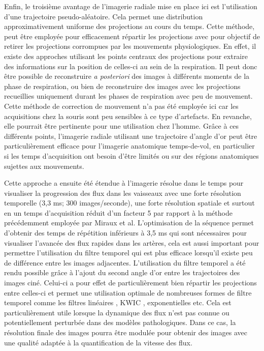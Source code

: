 Enfin, le troisième avantage de l’imagerie radiale mise en place ici est l’utilisation d’une trajectoire pseudo-aléatoire. Cela permet une distribution approximativement uniforme des projections au cours du temps. Cette méthode, peut être employée pour efficacement répartir les projections avec pour objectif de retirer les projections corrompues par les mouvements physiologiques. En effet, il existe des approches utilisant les points centraux des projections pour extraire des informations sur la position de celles-ci au sein de la respiration. Il peut donc être possible de reconstruire \textit{a posteriori} des images à différents moments de la phase de respiration, ou bien de reconstruire des images avec les projections recueillies uniquement durant les phases de respiration avec peu de mouvement. Cette méthode de correction de mouvement n’a pas été employée ici car les acquisitions chez la souris sont peu sensibles à ce type d’artefacts. En revanche, elle pourrait être pertinente pour une utilisation chez l’homme. Grâce à ces différents points, l’imagerie radiale utilisant une trajectoire d’angle d’or peut être particulièrement efficace pour l’imagerie anatomique temps-de-vol, en particulier si les temps d’acquisition ont besoin d’être limités ou sur des régions anatomiques sujettes aux mouvements.
 

Cette approche a ensuite été étendue à l'imagerie résolue dans le temps pour visualiser la progression des flux dans les vaisseaux avec une forte résolution temporelle (3,3 ms; 300 images/seconde), une forte résolution spatiale et surtout en un temps d'acquisition réduit d'un facteur 5 par rapport à la méthode précédemment employée par Miraux et al.
L'optimisation de la séquence permet d'obtenir des temps de répétition inférieurs à 3,5 ms qui sont nécessaires pour visualiser l'avancée des flux rapides dans les artères, cela est aussi important pour permettre l'utilisation du filtre temporel qui est plus efficace lorsqu'il existe peu de différence entre les images adjacentes.
L'utilisation du filtre temporel a été rendu possible grâce à l'ajout du second angle d'or entre les trajectoires des images ciné. Celui-ci a pour effet de particulièrement bien répartir les projections entre celles-ci et permet une utilisation optimale de nombreuses formes de filtre temporel comme les filtres linéaires \cite{Barger:2002fk}, KWIC \cite{Song2004Dynamic-MRI-wit}, exponentielles etc. Cela est particulièrement utile lorsque la dynamique des flux n'est pas connue ou potentiellement perturbée dans des modèles pathologiques. Dans ce cas, la résolution finale des images pourra être modulée pour obtenir des images avec une qualité adaptée à la quantification de la vitesse des flux.

